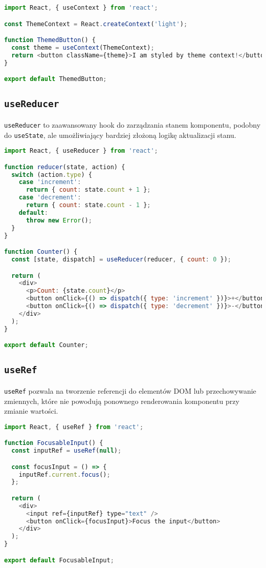 \documentclass[a4paper,12pt]{article}
\begin{document}
\begin{lstlisting}[language=JavaScript, caption=Przykład użycia \texttt{useContext}]
import React, { useContext } from 'react';

const ThemeContext = React.createContext('light');

function ThemedButton() {
  const theme = useContext(ThemeContext);
  return <button className={theme}>I am styled by theme context!</button>;
}

export default ThemedButton;
\end{lstlisting}

\subsection{\texttt{useReducer}}
\texttt{useReducer} to zaawansowany hook do zarządzania stanem komponentu, podobny do \texttt{useState}, ale umożliwiający bardziej złożoną logikę aktualizacji stanu.

\begin{lstlisting}[language=JavaScript, caption=Przykład użycia \texttt{useReducer}]
import React, { useReducer } from 'react';

function reducer(state, action) {
  switch (action.type) {
    case 'increment':
      return { count: state.count + 1 };
    case 'decrement':
      return { count: state.count - 1 };
    default:
      throw new Error();
  }
}

function Counter() {
  const [state, dispatch] = useReducer(reducer, { count: 0 });

  return (
    <div>
      <p>Count: {state.count}</p>
      <button onClick={() => dispatch({ type: 'increment' })}>+</button>
      <button onClick={() => dispatch({ type: 'decrement' })}>-</button>
    </div>
  );
}

export default Counter;
\end{lstlisting}

\subsection{\texttt{useRef}}
\texttt{useRef} pozwala na tworzenie referencji do elementów DOM lub przechowywanie zmiennych, które nie powodują ponownego renderowania komponentu przy zmianie wartości.

\begin{lstlisting}[language=JavaScript, caption=Przykład użycia \texttt{useRef}]
import React, { useRef } from 'react';

function FocusableInput() {
  const inputRef = useRef(null);

  const focusInput = () => {
    inputRef.current.focus();
  };

  return (
    <div>
      <input ref={inputRef} type="text" />
      <button onClick={focusInput}>Focus the input</button>
    </div>
  );
}

export default FocusableInput;
\end{lstlisting}
\end{document}

